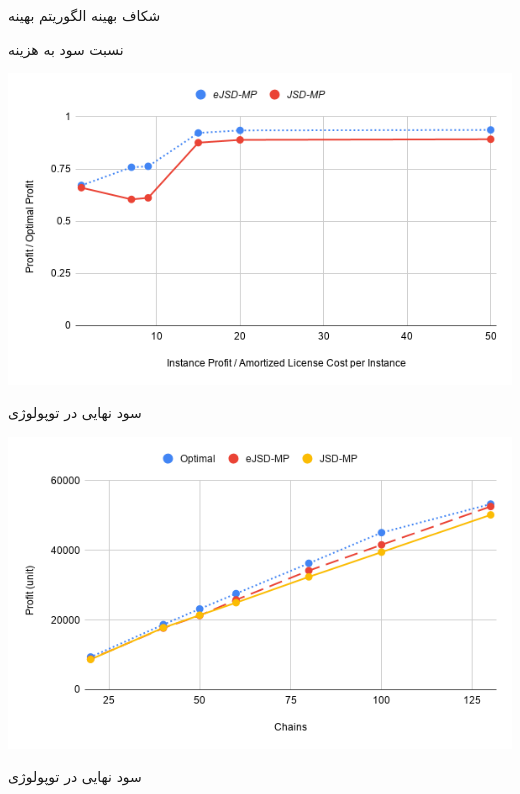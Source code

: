 \documentclass{beamer}
\begin{document}
\begin{persian}
\begin{frame}{شکاف بهینه الگوریتم بهینه}
\end{frame}
\begin{frame}{نسبت سود به هزینه}
    \begin{center}
        \includegraphics[scale=0.5]{images/chart-1.png}
    \end{center}
\end{frame}
\begin{frame}{سود نهایی در توپولوژی }
    \begin{center}
        \includegraphics[scale=0.5]{images/chart-2.png}
    \end{center}
\end{frame}
\begin{frame}{سود نهایی در توپولوژی }
    \begin{center}

\end{center}
\end{frame}
\end{persian}
\end{document}
